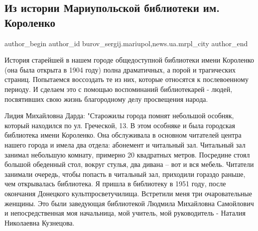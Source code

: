  
 
 
 
 
 
\subsection{Из истории Мариупольской библиотеки им. Короленко}
\label{sec:30_09_2017.stz.news.ua.mrpl_city.1.iz_istorii_mariupolskoj_biblioteki_im_korolenko}
 
\ifcmt
 author_begin
   author_id burov_sergij.mariupol,news.ua.mrpl_city
 author_end
\fi


История старейшей в нашем городе общедоступной библиотеки имени Короленко (она
была открыта  в 1904 году) полна драматичных, а порой и трагических страниц.
Попытаемся воссоздать те из них, которые относятся к послевоенному периоду. И
сделаем это с помощью воспоминаний библиотекарей - людей, посвятивших свою
жизнь благородному делу просвещения народа.


Лидия Михайловна Дарда: "Старожилы города помнят  небольшой особняк, который
находился по ул. Греческой, 13. В этом особняке и была городская библиотека
имени Короленко. Она обслуживала в основном читателей центра нашего города и
имела два отдела: абонемент и читальный зал. Читальный зал занимал небольшую
комнату, примерно 20 квадратных метров. Посредине стоял большой обеденный стол,
вокруг стулья, два дивана – вот и вся мебель. Читатели занимали очередь, чтобы
попасть в читальный зал, приходили гораздо раньше, чем открывалась библиотека.
Я пришла в библиотеку в 1951 году, после окончания Донецкого
культпросветучилища. Встретили меня три очаровательные женщины. Это были
заведующая библиотекой Людмила Михайловна Самойлович и непосредственная моя
начальница, мой учитель, мой руководитель - Наталия Николаевна Кузнецова.

